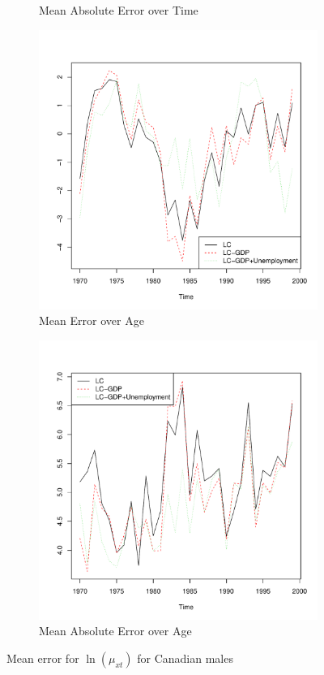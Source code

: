 \documentclass[AER, draftmode]{AEA}
\begin{document}
\begin{figure}[!htp]
\begin{subfigure}{0.4\textwidth}
		\caption{Mean Absolute Error over Time}
		\label{fig:errorb}
	\end{subfigure}
	\begin{subfigure}{0.4\textwidth}
		\includegraphics[width=\linewidth]{CAN_error_time_male} 
		\caption{Mean Error over Age}
		\label{fig:errorc}
	\end{subfigure}
	\begin{subfigure}{0.4\textwidth}
		\includegraphics[width=\linewidth]{CAN_abs_error_time_male} 
		\caption{Mean Absolute Error over Age}
		\label{fig:errord}
	\end{subfigure}
	\caption{Mean error for $\ln(\mu_{xt})$ for Canadian males}
\end{figure}
\end{document}
